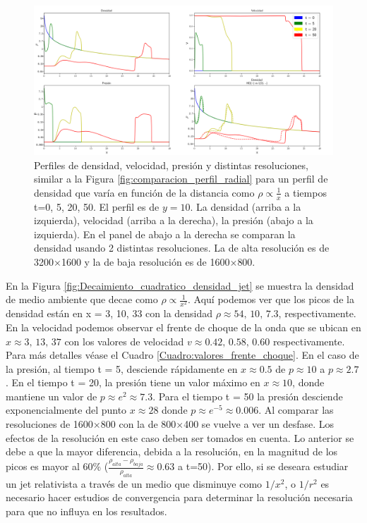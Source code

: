 \documentclass[12pt,a4paper]{book}
\begin{document}
\begin{figure}
  \centering
  \includegraphics[width = 1.0\textwidth]{./Figuras/capitulo_4/perfiles/perfiles_lineales.png}
  \caption{Perfiles de densidad, velocidad, presión y distintas resoluciones, similar a la Figura 
  \ref{fig:comparacion_perfil_radial} para un perfil de densidad que varía en función de la distancia como
  $\rho \varpropto \frac{1}{x}$ a tiempos t=0, 5, 20, 50.
  El perfil es de $y = 10$.
  La densidad (arriba a la izquierda), velocidad (arriba a la derecha), la presión (abajo a la izquierda). 
  En el panel de abajo a la derecha se comparan la densidad usando 2 distintas resoluciones. La de alta resolución
  es de 3200$\times$1600 y la de baja resolución es de 1600$\times$800.}\label{fig:Decaimiento_lineal_densidad_jet}
\end{figure}

En la Figura \ref{fig:Decaimiento_cuadratico_densidad_jet} se muestra la densidad de medio ambiente que decae como $\rho \varpropto \frac{1}{x^2}$. Aquí podemos ver que los  picos de la densidad están en x = 3, 10, 33 con
la densidad $\rho \approx 54, \,  10, \,  7.3$, respectivamente. En la velocidad podemos observar el frente de choque de la onda que se ubican en $x \approx 3, \, 13, \, 37$ con los valores de velocidad 
$v \approx 0.42, \, 0.58, \, 0.60$ respectivamente. Para más detalles véase el Cuadro \ref{Cuadro:valores_frente_choque}.
En el caso de la presión, al tiempo t = 5, desciende rápidamente en $x \approx 0.5$ de $p  \approx 10$ a $p  \approx 2.7$. En el tiempo t = 20, la presión tiene un valor máximo en $x \approx 10$, donde mantiene un 
valor de $p \approx e^2 \approx 7.3$. Para el tiempo t = 50 la presión desciende exponencialmente del punto $x \approx 28$ donde $p \approx e^{-5} \approx 0.006$. Al comparar las resoluciones de 1600$\times$800 con 
la de 800$\times$400 se vuelve a ver un desfase. Los efectos de la resolución en este caso deben ser tomados en cuenta. Lo anterior se debe a que la mayor diferencia, debida a la resolución, en la magnitud de 
los picos es mayor al 60\% ($\frac{\rho_{alta} - \rho_{baja}}{\rho_{alta}} \approx 0.63$ a t=50). Por ello, si se deseara estudiar un jet relativista a través de un medio que disminuye como $1/x^2$, o $1/r^2$ es 
necesario hacer estudios de convergencia para determinar la resolución necesaria para que no influya en los resultados. 
\end{document}
